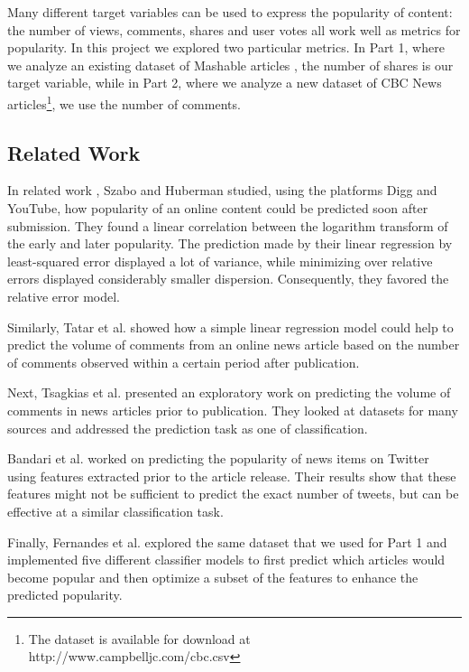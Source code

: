 \documentclass[conference,compsoc]{IEEEtran}
\begin{document}
Many different target variables can be used to express the popularity of content: the number of views, comments, shares and user votes all work well as metrics for popularity. In this project we explored two particular metrics. In Part 1, where we analyze an existing dataset of Mashable articles \cite{fernandes-2015-proactive}, the number of shares is our target variable, while in Part 2, where we analyze a new dataset of CBC News articles\footnote{The dataset is available for download at http://www.campbelljc.com/cbc.csv}, we use the number of comments.


\subsection{Related Work}
In related work \cite{szabo2010predicting}, Szabo and Huberman studied, using the platforms Digg and YouTube, how popularity of an online content could be predicted soon after submission. They found a linear correlation between the logarithm transform of the early and later popularity. The prediction made by their linear regression by least-squared error displayed a lot of variance, while minimizing over relative errors displayed considerably smaller dispersion. Consequently, they favored the relative error model.

Similarly, Tatar et al. \cite{tatar2011predicting} showed how a simple linear regression model could help to predict the volume of comments from an online news article based on the number of comments observed within a certain period after publication.

Next, Tsagkias et al. \cite{tsagkias2009predicting} presented an exploratory work on predicting the volume of comments in news articles prior to publication. They looked at datasets for many sources and addressed the prediction task as one of classification.

Bandari et al. \cite{bandari2012pulse} worked on predicting the popularity of news items on Twitter using features extracted prior to the article release. Their results show that these features might not be sufficient to predict the exact number of tweets, but can be effective at a similar classification task.

Finally, Fernandes et al. \cite{fernandes-2015-proactive} explored the same dataset that we used for Part 1 and implemented five different classifier models to first predict which articles would become popular and then optimize a subset of the features to enhance the predicted popularity. 
\end{document}
